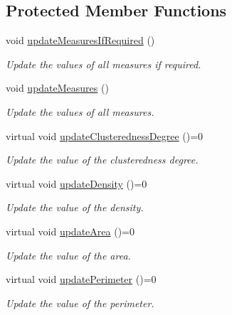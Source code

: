 \subsection*{\-Protected \-Member \-Functions}
\begin{DoxyCompactItemize}
\item 
void \hyperlink{classmultiscale_1_1analysis_1_1SpatialEntityPseudo3D_a151cd8c0fdfbc98cfd0adc99b9943369}{update\-Measures\-If\-Required} ()
\begin{DoxyCompactList}\small\item\em \-Update the values of all measures if required. \end{DoxyCompactList}\item 
void \hyperlink{classmultiscale_1_1analysis_1_1SpatialEntityPseudo3D_a24ad8b8b5768be1f917a1fb893df8c6c}{update\-Measures} ()
\begin{DoxyCompactList}\small\item\em \-Update the values of all measures. \end{DoxyCompactList}\item 
virtual void \hyperlink{classmultiscale_1_1analysis_1_1SpatialEntityPseudo3D_a750ba1b5e457d9d6504fc8320a76e002}{update\-Clusteredness\-Degree} ()=0
\begin{DoxyCompactList}\small\item\em \-Update the value of the clusteredness degree. \end{DoxyCompactList}\item 
virtual void \hyperlink{classmultiscale_1_1analysis_1_1SpatialEntityPseudo3D_a28fa63c1101f3f5ba7a0001099ee3159}{update\-Density} ()=0
\begin{DoxyCompactList}\small\item\em \-Update the value of the density. \end{DoxyCompactList}\item 
virtual void \hyperlink{classmultiscale_1_1analysis_1_1SpatialEntityPseudo3D_aa8c1cd3248c8926edbb1b47006ded902}{update\-Area} ()=0
\begin{DoxyCompactList}\small\item\em \-Update the value of the area. \end{DoxyCompactList}\item 
virtual void \hyperlink{classmultiscale_1_1analysis_1_1SpatialEntityPseudo3D_acb00990b4b812367b7ae8f16028b8c32}{update\-Perimeter} ()=0
\begin{DoxyCompactList}\small\item\em \-Update the value of the perimeter. \end{DoxyCompactList}\item 

\end{DoxyCompactItemize}
